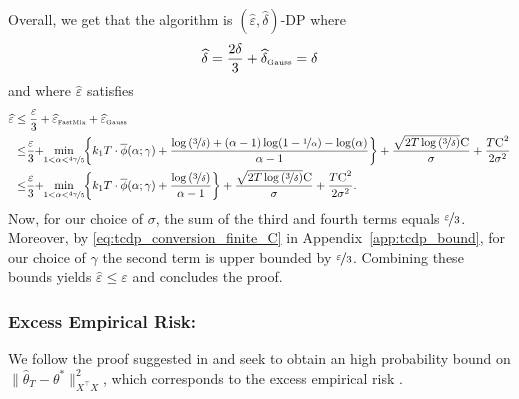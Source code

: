 \documentclass[11pt]{article}
\theoremstyle{definition}
\theoremstyle{plain}
\providecommand{\appendixref}[1]{Appendix~\ref{#1}}
\newcommand{\eps}{{\varepsilon}}
\renewcommand{\eps}{\varepsilon}
\begin{document}
Overall, we get that the algorithm is $\left(\widehat{\eps}, \widehat{\delta}\right)$-DP where 
\begin{equation}
    \widehat{\delta} = \frac{2\delta}{3} + \widehat{\delta}_{\text{\tiny Gauss}} = \delta
\end{equation}
and where $\widehat{\eps}$ satisfies
\begin{align}
    \label{eq:final_conversion}
    \widehat{\eps} &\leq \frac{\eps}{3} + \widehat{\eps}_{\text{\tiny FastMix}} + \widehat{\eps}_{\text{\tiny Gauss}}\\
    &\leq\hspace{-0.25em}\frac{\eps}{3}\hspace{-0.25em}+\hspace{-0.25em}\underset{1 < \alpha < \nicefrac{4\gamma}{5}}{\min}\hspace{-0.25em}\left\{k_1T\cdot \overline{\phi}(\alpha;\gamma) + \frac{\log\left(\nicefrac{3}{\delta}\right) + (\alpha - 1)\log(1 - \nicefrac{1}{\alpha}) - \log(\alpha)}{\alpha - 1}\right\} + \frac{\sqrt{2T\log\left(\nicefrac{3}{\delta}\right)}\textsc{C}}{\sigma} + \frac{T\textsc{C}^2}{2\sigma^2}\\
    &\leq\hspace{-0.25em}\frac{\eps}{3}\hspace{-0.25em}+\hspace{-0.25em}\underset{1 < \alpha < \nicefrac{4\gamma}{5}}{\min}\hspace{-0.25em}\left\{k_1T\cdot \overline{\phi}(\alpha;\gamma) + \frac{\log\left(\nicefrac{3}{\delta}\right)}{\alpha - 1}\right\} + \frac{\sqrt{2T\log\left(\nicefrac{3}{\delta}\right)}\textsc{C}}{\sigma} + \frac{T\textsc{C}^2}{2\sigma^2}.
\end{align} 
Now, for our choice of $\sigma$, the sum of the third and fourth terms equals $\nicefrac{\eps}{3}$. Moreover, by \eqref{eq:tcdp_conversion_finite_C} in \appendixref{app:tcdp_bound}, for our choice of $\gamma$ the second term is upper bounded by $\nicefrac{\eps}{3}$. Combining these bounds yields $\widehat{\eps} \leq \eps$ and concludes the proof. \hfill \qedsymbol

\subsubsection{Excess Empirical Risk:}
\label{app:proof_thm_linear_accuracy}
We follow the proof suggested in \citet{lev2026near} and seek to obtain an high probability bound on $\|\widehat{\theta}_T - \theta^{*}\|^2_{X^{\top}X}$, which corresponds to the excess empirical risk \citep[Lemma.~5]{wang_adassp}. 
\end{document}
